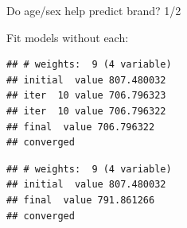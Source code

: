 \begin{frame}[fragile]{Do age/sex help predict brand? 1/2}

Fit models without each:

 
\begin{knitrout}
\color{fgcolor}\begin{kframe}
\begin{alltt}
\hlkwb{=}\hlopt{~}
\end{alltt}
\begin{verbatim}
## # weights:  9 (4 variable)
## initial  value 807.480032 
## iter  10 value 706.796323
## iter  10 value 706.796322
## final  value 706.796322 
## converged
\end{verbatim}
\begin{alltt}
\hlkwb{=}\hlopt{~}
\end{alltt}
\begin{verbatim}
## # weights:  9 (4 variable)
## initial  value 807.480032 
## final  value 791.861266 
## converged
\end{verbatim}
\end{kframe}
\end{knitrout}


  
\end{frame}

